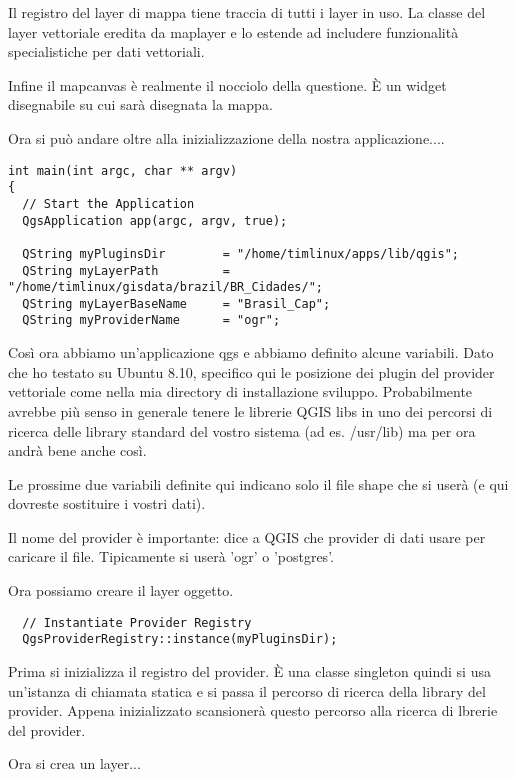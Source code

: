 Il registro del layer di mappa tiene traccia di tutti i layer in uso. La classe del layer vettoriale eredita da maplayer e lo estende ad includere funzionalità specialistiche per dati vettoriali.

Infine il mapcanvas è realmente il nocciolo della questione. È un widget disegnabile su cui sarà disegnata la mappa.

Ora si può andare oltre alla inizializzazione della nostra applicazione....

\begin{verbatim}
int main(int argc, char ** argv)
{
  // Start the Application
  QgsApplication app(argc, argv, true);

  QString myPluginsDir        = "/home/timlinux/apps/lib/qgis";
  QString myLayerPath         = "/home/timlinux/gisdata/brazil/BR_Cidades/";
  QString myLayerBaseName     = "Brasil_Cap";
  QString myProviderName      = "ogr";

\end{verbatim}

Così ora abbiamo un'applicazione qgs e abbiamo definito alcune variabili. Dato che ho testato su Ubuntu 8.10, specifico qui le posizione dei plugin del provider vettoriale come nella mia directory di installazione sviluppo. Probabilmente avrebbe più senso in generale tenere le librerie QGIS libs in uno dei percorsi di ricerca delle library standard del vostro sistema (ad es. /usr/lib) ma per ora andrà bene anche così.

Le prossime due variabili definite qui indicano solo il file shape che si userà (e qui dovreste sostituire i vostri dati).

Il nome del provider è importante: dice a QGIS che provider di dati usare per caricare il file. Tipicamente si userà 'ogr' o 'postgres'.

Ora possiamo creare il layer oggetto.

\begin{verbatim}
  // Instantiate Provider Registry
  QgsProviderRegistry::instance(myPluginsDir);
\end{verbatim}

Prima si inizializza il registro del provider. È una classe singleton quindi si usa un'istanza di chiamata statica e si passa il percorso di ricerca della library del provider. Appena inizializzato scansionerà questo percorso alla ricerca di lbrerie del provider.

Ora si crea un layer...

